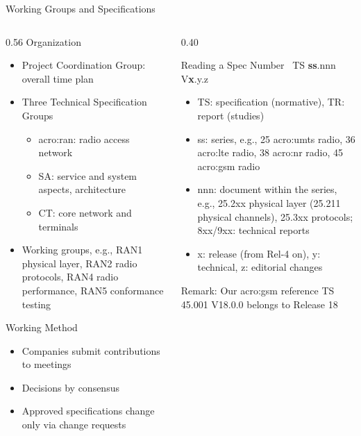 \begin{frame}{Working Groups and Specifications}
  \begin{columns}[T,onlytextwidth]
    \begin{column}{0.56\textwidth}
      Organization
      \begin{itemize}
        \item Project Coordination Group: overall time plan
        \item Three Technical Specification Groups~\cite{3gpp-intro}
          \begin{itemize}
            \item \acrshort{acro:ran}: radio access network
            \item SA: service and system aspects, architecture
            \item CT: core network and terminals
          \end{itemize}
        \item Working groups, e.g., RAN1 physical layer, RAN2 radio protocols, RAN4 radio performance, RAN5 conformance testing
      \end{itemize}
      \vspace{0.4em}
      Working Method
      \begin{itemize}
        \item Companies submit contributions to meetings
        \item Decisions by consensus
        \item Approved specifications change only via change requests
      \end{itemize}
    \end{column}
    \begin{column}{0.40\textwidth}
      \begin{block}{Reading a Spec Number~\cite{3gpp-spec-series,3gpp-version-numbering}}
        \centering
        TS \textbf{ss}.nnn V\textbf{x}.y.z
        \raggedright
        \begin{itemize}
          \item TS: specification (normative), TR: report (studies)
          \item ss: series, e.g., 25 \gls{acro:umts} radio, 36 \gls{acro:lte} radio, 38 \gls{acro:nr} radio, 45 \gls{acro:gsm} radio
          \item nnn: document within the series, e.g., 25.2xx physical layer (25.211 physical channels), 25.3xx protocols; 8xx/9xx: technical reports
          \item x: release (from Rel-4 on), y: technical, z: editorial changes
        \end{itemize}
      \end{block}
      \alert{Remark:} Our \gls{acro:gsm} reference TS 45.001 V18.0.0 belongs to Release 18
    \end{column}
  \end{columns}
\end{frame}

